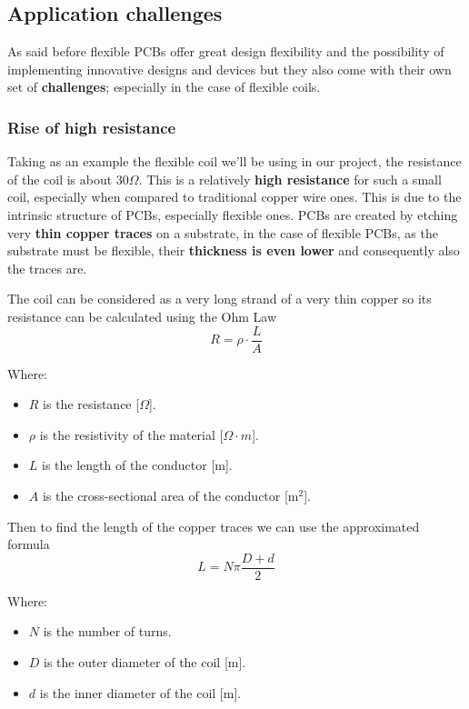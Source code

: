 \subsection{Application challenges}
\label{subsec: Application challenges}
As said before flexible PCBs offer great design flexibility and the possibility of implementing innovative designs and devices but they also come with their own set of \textbf{challenges}; especially in the case of flexible coils.

\subsubsection{Rise of high resistance}
Taking as an example the flexible coil we'll be using in our project, the resistance of the coil is about 30\(\Omega\). This is a relatively \textbf{high resistance} for such a small coil, especially when compared to traditional copper wire ones. 
This is due to the intrinsic structure of PCBs, especially flexible ones.
PCBs are created by etching very \textbf{thin copper traces} on a substrate, in the case of flexible PCBs, as the substrate must be flexible, their \textbf{thickness is even lower} and consequently also the traces are.

\begin{samepage}
    The coil can be considered as a very long strand of a very thin copper so its resistance can be calculated using the Ohm Law
    \begin{equation}
        R=\rho \cdot \frac{L}{A}
    \end{equation}
    \nopagebreak

    Where:
    \begin{itemize}
        \item \( R \) is the resistance [\(\Omega\)].
        \item \( \rho \) is the resistivity of the material [\(\Omega \cdot m\)].
        \item \( L \) is the length of the conductor [m].
        \item \( A \) is the cross-sectional area of the conductor [m\(^2\)].
    \end{itemize}
\end{samepage}

\begin{samepage}
    Then to find the length of the copper traces we can use the approximated formula \cite{Length_of_a_Spiral}
    \begin{equation}
        L = N \pi \frac{D+d}{2}
    \end{equation}
    \nopagebreak 

    Where:
    \begin{itemize}
        \item \( N \) is the number of turns.
        \item \( D \) is the outer diameter of the coil [m].
        \item \( d \) is the inner diameter of the coil [m].
    \end{itemize}
\end{samepage}

